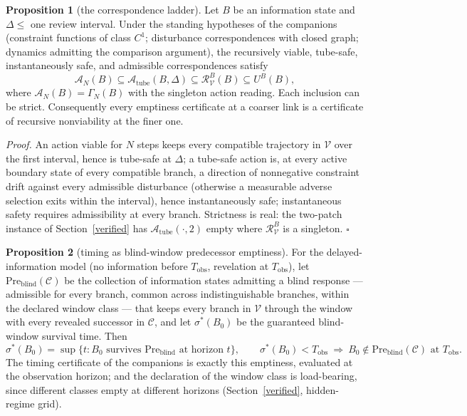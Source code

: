 \documentclass[10pt,twocolumn]{article}
\theoremstyle{definition}
\newtheorem{proposition}{Proposition}
\begin{document}
\begin{proposition}[the correspondence ladder]\label{prop:ladder}
Let \(B\) be an information state and \(\Delta \le\) one review interval.
Under the standing hypotheses of the companions (constraint functions of
class \(C^1\); disturbance correspondences with closed graph; dynamics
admitting the comparison argument), the recursively viable, tube-safe,
instantaneously safe, and admissible correspondences satisfy
\[
\mathcal{A}_{N}(B) \subseteq \mathcal{A}_{\mathrm{tube}}(B, \Delta)
\subseteq \mathcal{R}^{B}_{\mathcal{V}}(B) \subseteq U^{B}(B),
\]
where \(\mathcal{A}_{N}(B) = \Gamma_{N}(B)\) with the singleton action
reading. Each inclusion can be strict. Consequently every emptiness
certificate at a coarser link is a certificate of recursive nonviability at
the finer one.
\end{proposition}

\emph{Proof.} An action viable for \(N\) steps keeps every compatible
trajectory in \(\mathcal{V}\) over the first interval, hence is tube-safe at
\(\Delta\); a tube-safe action is, at every active boundary state of every
compatible branch, a direction of nonnegative constraint drift against
every admissible disturbance (otherwise a measurable adverse selection
exits within the interval), hence instantaneously safe; instantaneous safety
requires admissibility at every branch. Strictness is real: the two-patch
instance of Section~\ref{verified} has
\(\mathcal{A}_{\mathrm{tube}}(\cdot, 2)\) empty where
\(\mathcal{R}^{B}_{\mathcal{V}}\) is a singleton. \hfill\(\square\)

\begin{proposition}[timing as blind-window predecessor emptiness]\label{prop:timing}
For the delayed-information model (no information before \(T_{\mathrm{obs}}\),
revelation at \(T_{\mathrm{obs}}\)), let
\(\mathrm{Pre}_{\mathrm{blind}}(\mathscr{C})\) be the collection of
information states admitting a blind response --- admissible for every
branch, common across indistinguishable branches, within the declared
window class --- that keeps every branch in \(\mathcal{V}\) through the
window with every revealed successor in \(\mathscr{C}\), and let
\(\sigma^{*}(B_0)\) be the guaranteed blind-window survival time. Then
\[
\sigma^{*}(B_0) = \sup \{ t : B_0 \text{ survives } \mathrm{Pre}_{\mathrm{blind}}
\text{ at horizon } t \}, \qquad
\sigma^{*}(B_0) < T_{\mathrm{obs}} \ \Longrightarrow\ B_0 \notin
\mathrm{Pre}_{\mathrm{blind}}(\mathscr{C}) \text{ at } T_{\mathrm{obs}}.
\]
The timing certificate of the companions is exactly this emptiness, evaluated
at the observation horizon; and the declaration of the window class is
load-bearing, since different classes empty at different horizons
(Section~\ref{verified}, hidden-regime grid).
\end{proposition}
\end{document}
